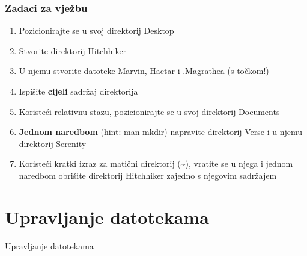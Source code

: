 \documentclass{beamer}
\begin{document}
\begin{frame}[t]
\frametitle{Zadaci za vježbu}
  \begin{enumerate}
    \setlength\itemsep{1em}
    \item Pozicionirajte se u svoj direktorij Desktop
    \item Stvorite direktorij Hitchhiker
    \item U njemu stvorite datoteke Marvin, Hactar i .Magrathea (s točkom!)
    \item Ispišite \textbf{cijeli} sadržaj direktorija
    \item Koristeći relativnu stazu, pozicionirajte se u svoj direktorij Documents
    \item \textbf{Jednom naredbom} (hint: man mkdir) napravite direktorij Verse i u njemu direktorij Serenity
    \item Koristeći kratki izraz za matični direktorij (\textasciitilde), vratite se u njega i jednom naredbom obrišite direktorij Hitchhiker zajedno s njegovim sadržajem
  \end{enumerate}
\end{frame}

\section{Upravljanje datotekama}
\begin{frame}[c]
  \begin{center}
    \begin{Huge}
      Upravljanje datotekama
    \end{Huge}
  \end{center}
\end{frame}
\end{document}
